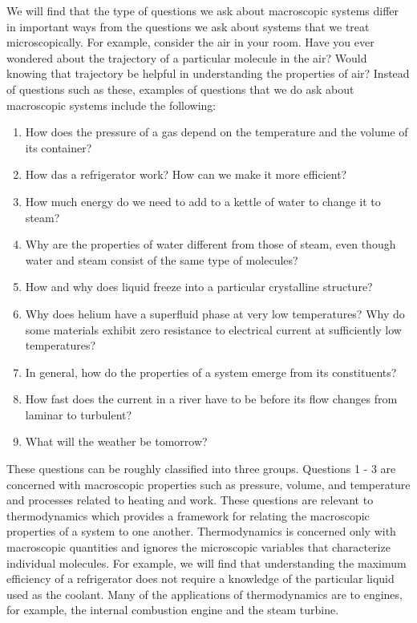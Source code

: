 We will find that the type of questions we ask about macroscopic systems differ in important ways from the questions we ask about systems that we treat microscopically.
For example, consider the air in your room.
Have you ever wondered about the trajectory of a particular molecule in the air?
Would knowing that trajectory be helpful in understanding the properties of air?
Instead of questions such as these, examples of questions that we do ask about macroscopic systems include the following:
\begin{enumerate}
	\item How does the pressure of a gas depend on the temperature and the volume of its container?
	\item How das a refrigerator work?
	How can we make it more efficient?
	\item How much energy do we need to add to a kettle of water to change it to steam?
	\item Why are the properties of water different from those of steam, even though water and steam consist of the same type of molecules?
	\item How and why does liquid freeze into a particular crystalline structure?
	\item Why does helium have a superfluid phase at very low temperatures?
	Why do some materials exhibit zero resistance to electrical current at sufficiently low temperatures?
	\item In general, how do the properties of a system emerge from its constituents?
	\item How fast does the current in a river have to be before its flow changes from laminar to turbulent?
	\item What will the weather be tomorrow?
\end{enumerate}
These questions can be roughly classified into three groups.
Questions 1 - 3 are concerned with macroscopic properties such as pressure, volume, and temperature and processes related to heating and work.
These questions are relevant to thermodynamics which provides a framework for relating the macroscopic properties of a system to one another.
Thermodynamics is concerned only with macroscopic quantities and ignores the microscopic variables that characterize individual molecules.
For example, we will find that understanding the maximum efficiency of a refrigerator does not require a knowledge of the particular liquid used as the coolant.
Many of the applications of thermodynamics are to engines, for example, the internal combustion engine and the steam turbine.

